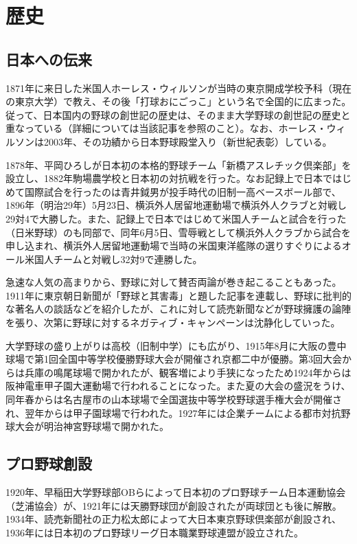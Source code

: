 \documentclass[10.5pt]{jarticle}
\begin{document}
\section{歴史}
\subsection{日本への伝来}
1871年に来日した米国人ホーレス・ウィルソンが当時の東京開成学校予科（現在の東京大学）で教え、その後「打球おにごっこ」という名で全国的に広まった。従って、日本国内の野球の創世記の歴史は、そのまま大学野球の創世記の歴史と重なっている（詳細については当該記事を参照のこと）。なお、ホーレス・ウィルソンは2003年、その功績から日本野球殿堂入り（新世紀表彰）している。

1878年、平岡ひろしが日本初の本格的野球チーム「新橋アスレチック倶楽部」を設立し、1882年駒場農学校と日本初の対抗戦を行った。なお記録上で日本ではじめて国際試合を行ったのは青井鉞男が投手時代の旧制一高ベースボール部で、1896年（明治29年）5月23日、横浜外人居留地運動場で横浜外人クラブと対戦し29対4で大勝した。また、記録上で日本ではじめて米国人チームと試合を行った（日米野球）のも同部で、同年6月5日、雪辱戦として横浜外人クラブから試合を申し込まれ、横浜外人居留地運動場で当時の米国東洋艦隊の選りすぐりによるオール米国人チームと対戦し32対9で連勝した。

急速な人気の高まりから、野球に対して賛否両論が巻き起こることもあった。1911年に東京朝日新聞が「野球と其害毒」と題した記事を連載し、野球に批判的な著名人の談話などを紹介したが、これに対して読売新聞などが野球擁護の論陣を張り、次第に野球に対するネガティブ・キャンペーンは沈静化していった。

大学野球の盛り上がりは高校（旧制中学）にも広がり、1915年8月に大阪の豊中球場で第1回全国中等学校優勝野球大会が開催され京都二中が優勝。第3回大会からは兵庫の鳴尾球場で開かれたが、観客増により手狭になったため1924年からは阪神電車甲子園大運動場で行われることになった。また夏の大会の盛況をうけ、同年春からは名古屋市の山本球場で全国選抜中等学校野球選手権大会が開催され、翌年からは甲子園球場で行われた。1927年には企業チームによる都市対抗野球大会が明治神宮野球場で開かれた。


\subsection{プロ野球創設}
1920年、早稲田大学野球部OBらによって日本初のプロ野球チーム日本運動協会（芝浦協会）が、1921年には天勝野球団が創設されたが両球団とも後に解散。1934年、読売新聞社の正力松太郎によって大日本東京野球倶楽部が創設され、1936年には日本初のプロ野球リーグ日本職業野球連盟が設立された。
\end{document}
